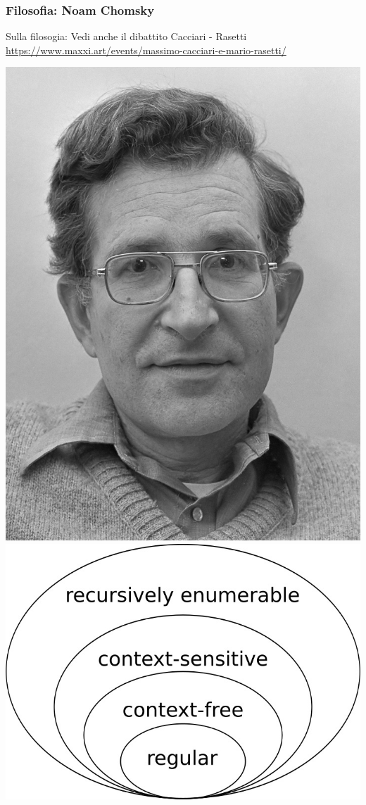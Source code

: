 \documentclass[xcolor=svgnames]{beamer}
\begin{document}
\begin{frame}\small\frametitle{Filosofia: Noam Chomsky}

Sulla filosogia: Vedi anche il dibattito Cacciari - Rasetti \url{https://www.maxxi.art/events/massimo-cacciari-e-mario-rasetti/}

  \includegraphics[height=0.5\textheight]{pictures/Noam_Chomsky_(1977).jpg} \hfill   \includegraphics[height=0.5\textheight]{pictures/Chomsky-hierarchy.jpg}


\end{frame}
\end{document}
